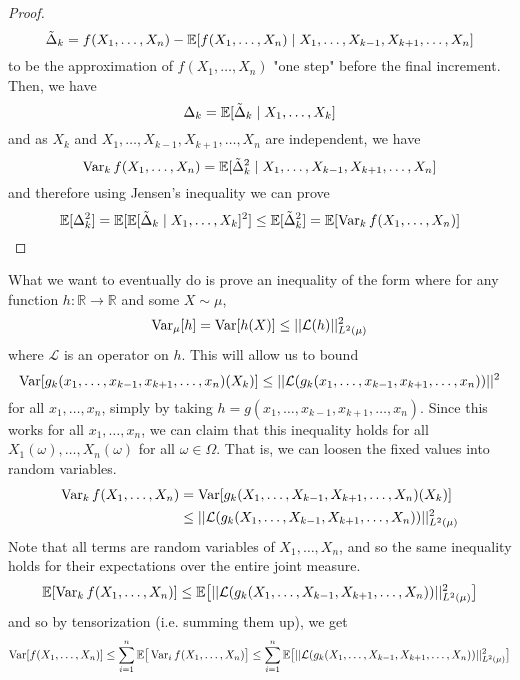\begin{proof}
  \[\Tilde{\Delta}_k = f(X_1, \ldots, X_n) - \mathbb{E}[f(X_1, \ldots, X_n) \mid X_1, \ldots, X_{k-1}, X_{k+1}, \ldots, X_n]\]
  to be the approximation of $f(X_1, \ldots, X_n)$ "one step" before the final increment. Then, we have 
  \[\Delta_k = \mathbb{E}[\Tilde{\Delta}_k \mid X_1, \ldots, X_k]\]
  and as $X_k$ and $X_1, \ldots, X_{k-1}, X_{k+1}, \ldots, X_n$ are independent, we have 
  \[\operatorname{Var}_k f(X_1, \ldots, X_n) = \mathbb{E}[\Tilde{\Delta}_k^2 \mid X_1, \ldots, X_{k-1}, X_{k+1}, \ldots, X_n] \]
  and therefore using Jensen's inequality we can prove 
  \[\mathbb{E}[\Delta_k^2] = \mathbb{E}[\mathbb{E}[ \Tilde{\Delta}_k \mid X_1, \ldots, X_k]^2 ] \leq \mathbb{E}[\Tilde{\Delta}_k^2] = \mathbb{E}[\operatorname{Var}_k f(X_1, \ldots, X_n)]\]
  \end{proof}

  What we want to eventually do is prove an inequality of the form where for any function $h: \mathbb{R} \rightarrow \mathbb{R}$ and some $X \sim \mu$, 
  \[\operatorname{Var}_\mu[h] = \operatorname{Var} [h(X)] \leq ||\mathcal{L}(h)||^2_{L^2 (\mu)}\]
  where $\mathcal{L}$ is an operator on $h$. This will allow us to bound 
  \[\operatorname{Var} [g_k (x_1, \ldots, x_{k-1}, x_{k+1}, \ldots, x_n)(X_k)] \leq ||\mathcal{L}(g_k (x_1, \ldots, x_{k-1}, x_{k+1}, \ldots, x_n))||^2\]
  for all $x_1, \ldots, x_n$, simply by taking $h = g(x_1, \ldots, x_{k-1}, x_{k+1}, \ldots, x_n)$. Since this works for all $x_1, \ldots, x_n$, we can claim that this inequality holds for all $X_1 (\omega), \ldots, X_n (\omega)$ for all $\omega \in \Omega$. That is, we can loosen the fixed values into random variables. 
  \begin{align*}
      \operatorname{Var}_{k} f(X_1, \ldots, X_n) & = \operatorname{Var}[g_k (X_1, \ldots, X_{k-1}, X_{k+1}, \ldots, X_n)(X_k)] \\
      & \leq || \mathcal{L}(g_k (X_1, \ldots, X_{k-1}, X_{k+1}, \ldots, X_n))||^2_{L^2 (\mu)} 
  \end{align*}
  Note that all terms are random variables of $X_1, \ldots, X_n$, and so the same inequality holds for their expectations over the entire joint measure. 
  \[\mathbb{E}[ \operatorname{Var}_{k} f(X_1, \ldots, X_n) ] \leq \mathbb{E} \big[ || \mathcal{L}(g_k (X_1, \ldots, X_{k-1}, X_{k+1}, \ldots, X_n))||^2_{L^2 (\mu)} \big] \]
  and so by tensorization (i.e. summing them up), we get 
  \[\operatorname{Var}[f(X_1, \ldots, X_n)] \leq \sum_{i=1}^n \mathbb{E} \big[ \operatorname{Var}_i f(X_1, \ldots, X_n) \big] \leq \sum_{i=1}^n \mathbb{E} \big[ || \mathcal{L}(g_k (X_1, \ldots, X_{k-1}, X_{k+1}, \ldots, X_n))||^2_{L^2 (\mu)} \big] \]

